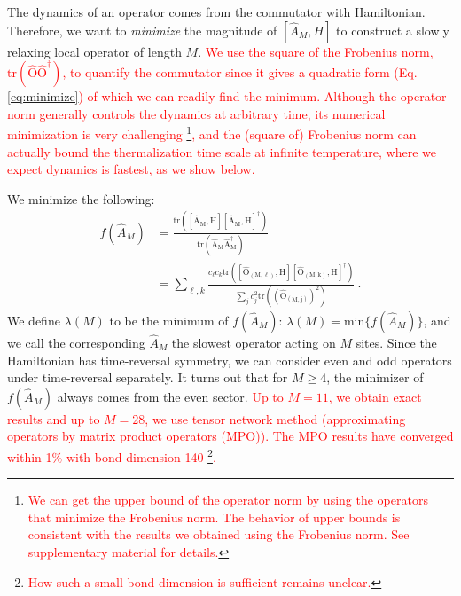 \documentclass[twocolumn,superscriptaddress, prl,showpacs]{revtex4-1}
\newcommand{\addr}[1]{\textcolor{red}{#1}}
\begin{document}
The dynamics of an operator comes from the commutator with Hamiltonian.
Therefore, we want to {\it minimize} the magnitude of $[\hat{A}_M, H]$
to construct a slowly relaxing local operator of length $M$.
\addr{We use the square of the Frobenius norm, $\mathrm{tr(\hat{O}\hat{O}^\dag)}$, to quantify the commutator 
since it gives a quadratic form  (Eq. \eqref{eq:minimize}) of which we can readily find the minimum. 
Although the operator norm generally controls the dynamics at arbitrary time, its numerical minimization is very challenging 
\footnote{\addr{We can get the upper bound of the operator norm by using the operators that minimize the Frobenius norm. 
The behavior of upper bounds is consistent with the results we obtained using the Frobenius norm. 
See supplementary material for details.}}, and the (square of) Frobenius norm can actually bound the thermalization time scale at infinite temperature,
where we expect dynamics is fastest, as we show below.} 

We minimize the following:
\begin{align}\label{eq:minimize}
f(\hat{A}_M) &= \frac{\mathrm{tr([\hat{A}_M,H][\hat{A}_M,H]^\dag)}}{\mathrm{tr(\hat{A}_M\hat{A}^\dag_M)}} \nonumber\\
&= \sum_{\ell,k}\frac{c_\ell c_k \mathrm{tr([\hat{O}_{(M,\ell)},H][\hat{O}_{(M,k)},H]^\dag)}}{\sum_j c_j ^2 \mathrm{tr((\hat{O}_{(M,j)})^2)}} ~.
\end{align}
We define $\lambda(M)$ to be the minimum of $f(\hat{A}_M)$:
$\lambda(M) = \mathrm{min}\{f(\hat{A}_M)\}$,
and we call the corresponding $\hat{A}_M$ the slowest operator acting on $M$ sites.
Since the Hamiltonian has time-reversal symmetry,
we can consider even and odd operators under time-reversal separately.
It turns out that for $M\geq 4$, the minimizer of $f(\hat{A}_M)$ always comes from the even sector.
\addr{Up to $M = 11$, we obtain exact results and up to $M = 28$, we use tensor network method (approximating operators by matrix product operators (MPO)).
The MPO results have converged within 1$\%$ with bond dimension 140 \footnote{\addr{How such a small bond dimension is sufficient remains unclear.} }.}
\end{document}

